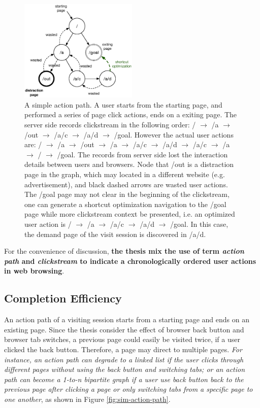 \begin{figure}[H]
    \centering
    \includegraphics[width=0.5\textwidth]{figures/clickstream}
    \caption{A simple action path. A user starts from the starting page, and performed
    a series of page click actions, ends on a exiting page. 
    The server side records clickstream in the following order:
    / $\rightarrow$ /a $\rightarrow$ /out $\rightarrow$ /a/c $\rightarrow$ /a/d $\rightarrow$ /goal.
    However the actual user actions are: 
    / $\rightarrow$ /a $\rightarrow$ /out $\rightarrow$ /a $\rightarrow$ /a/c $\rightarrow$ /a/d 
    $\rightarrow$ /a/c $\rightarrow$ /a $\rightarrow$ / $\rightarrow$ /goal. 
    The records from server side lost the interaction details between users and browsers.
    Node that /out is a distraction page in the graph, 
    which may located in a different website (e.g. advertisement), 
    and black dashed arrows are wasted user
    actions. The /goal page may not clear in the beginning of the clickstream, one can generate
    a shortcut optimization navigation to the /goal page while more clickstream context
    be presented, i.e. an optimized user action is 
    / $\rightarrow$ /a $\rightarrow$ /a/c $\rightarrow$ /a/d $\rightarrow$ /goal. In this case,
    the demand page of the visit session is discovered in /a/d.}
    \label{fig:clickstream}
\end{figure}

For the convenience of discussion, \textbf{the thesis mix the use of 
term \emph{action path} and \emph{clickstream} to indicate a chronologically ordered user actions
in web browsing}.

\subsection{Completion Efficiency}
\label{sec:efficiency}
An action path of a visiting session starts from a starting page and ends on an existing page.
Since the thesis consider the effect of browser back button and browser tab switches, 
a previous page could easily be visited twice, if a user clicked the back button. 
Therefore, a page may direct to multiple pages. \emph{For instance, 
an action path can degrade to a linked list if the user clicks through different pages 
without using the back button and switching tabs; or an action path can become 
a 1-to-n bipartite graph if a user use back button back to the previous page after 
clicking a page or only switching tabs from a specific page to one another}, 
as shown in Figure \ref{fig:sim-action-path}.


